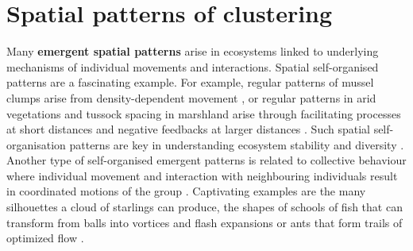 \documentclass[10pt, twoside]{book} %
\begin{document}
	\section{Spatial patterns of clustering}\label{spatpatt}
	Many \textbf{emergent spatial patterns} arise in ecosystems linked to underlying mechanisms of individual movements and interactions. Spatial self-organised patterns are a fascinating example. For example, regular patterns of mussel clumps arise from density-dependent movement \citep{vandekoppel2008, liu2013}, or regular patterns in arid vegetations and tussock spacing in marshland arise through facilitating processes at short distances and negative feedbacks at larger distances \citep{couteron2001, vandekoppel2006, rietkerk2008}. Such spatial self-organisation patterns are key in understanding ecosystem stability and diversity \citep{rietkerk2004}. Another type of self-organised emergent patterns is related to collective behaviour where individual movement and interaction with neighbouring individuals result in coordinated motions of the group \citep{sumpter2006}. Captivating examples are the many silhouettes a cloud of starlings can produce, the shapes of schools of fish that can transform from balls into vortices and flash expansions or ants that form trails of optimized flow \citep{couzin2003, lopez2012}.\\
	
\end{document}
